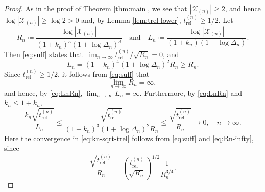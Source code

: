 \documentclass[a4paper, reqno, 11pt]{amsart}
\theoremstyle{definition}
\begin{document}
\begin{proof}
As in the proof of Theorem \ref{thm:main}, we see that $|\mathcal{X}_{(n)}| \ge 2$,
and hence $\log |\mathcal{X}_{(n)}| \ge \log 2 > 0$ and, by Lemma \ref{lem:trel-lower}, $t_{\mathrm{rel}}^{(n)} \ge 1/2$.
Let
\[ R_n \coloneqq \frac{\log |\mathcal{X}_{(n)}|}{(1+k_n)^{5}\left(1+\log \Delta_n\right)^{3}}
\quad \text{and} \quad
L_n \coloneqq \frac{\log |\mathcal{X}_{(n)}|}{(1+k_n)\left(1+\log \Delta_n\right)}. \]
Then \eqref{eq:suff} states that $\lim_{n \to \infty} t_{\mathrm{rel}}^{(n)}/\sqrt{R_n} = 0$, and
\begin{equation}\label{eq:LnRn}
L_n = (1+k_n)^{4}\left(1+\log \Delta_n\right)^{2} R_n \ge R_n.
\end{equation}
Since $t_{\mathrm{rel}}^{(n)} \ge 1/2$, it follows from \eqref{eq:suff} that
\begin{equation}\label{eq:Rn-infty}
\lim_{n \to \infty} R_n = \infty,
\end{equation}
and hence, by \eqref{eq:LnRn}, $\lim_{n \to \infty} L_n = \infty$.
Furthermore, by \eqref{eq:LnRn} and $k_n \le 1+k_n$,
\begin{equation}\label{eq:kn-sqrt-trel}
\frac{k_n \sqrt{t_{\mathrm{rel}}^{(n)}}}{L_n} \le \frac{\sqrt{t_{\mathrm{rel}}^{(n)}}}{(1+k_n)^{3}\left(1+\log \Delta_n\right)^{2} R_n} \le \frac{\sqrt{t_{\mathrm{rel}}^{(n)}}}{R_n} \to 0, \quad n \to \infty.
\end{equation}
Here the convergence in \eqref{eq:kn-sqrt-trel} follows from \eqref{eq:suff} and \eqref{eq:Rn-infty}, since
\[ \frac{\sqrt{t_{\mathrm{rel}}^{(n)}}}{R_n} = \left(\frac{t_{\mathrm{rel}}^{(n)}}{\sqrt{R_n}}\right)^{1/2} \frac{1}{R_n^{3/4}}. \]


\end{proof}
\end{document}
